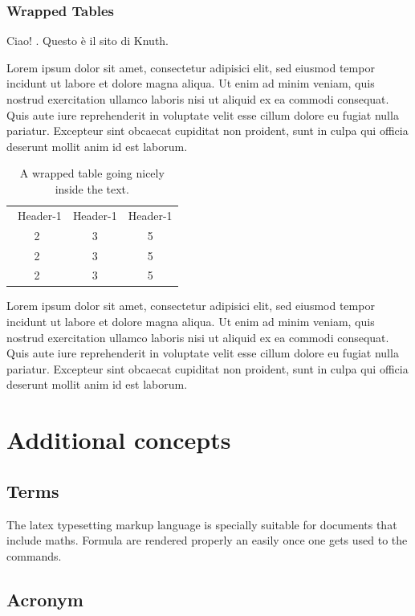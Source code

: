 \subsection{Wrapped Tables}

Ciao! \cite{knuthwebsite}. Questo è il sito di Knuth.

Lorem ipsum dolor sit amet, consectetur adipisici elit, sed eiusmod tempor incidunt ut labore et dolore magna aliqua. Ut enim ad minim veniam, quis nostrud exercitation ullamco laboris nisi ut aliquid ex ea commodi consequat. Quis aute iure reprehenderit in voluptate velit esse cillum dolore eu fugiat nulla pariatur. Excepteur sint obcaecat cupiditat non proident, sunt in culpa qui officia deserunt mollit anim id est laborum.
\begin{table}
\caption{A wrapped table going nicely inside the text.}\label{wrap-tab:1}
\begin{tabular}{ccc}\  
Header-1 & Header-1 & Header-1 \\
2 &3 & 5\\  
2 &3 & 5\\  
2 &3 & 5\\  
\end{tabular}
\end{table}
Lorem ipsum dolor sit amet, consectetur adipisici elit, sed eiusmod tempor incidunt ut labore et dolore magna aliqua. Ut enim ad minim veniam, quis nostrud exercitation ullamco laboris nisi ut aliquid ex ea commodi consequat. Quis aute iure reprehenderit in voluptate velit esse cillum dolore eu fugiat nulla pariatur. Excepteur sint obcaecat cupiditat non proident, sunt in culpa qui officia deserunt mollit anim id est laborum.

\chapter{Additional concepts}

\section{Terms}

The \Gls{latex} typesetting markup language is specially suitable 
for documents that include maths. Formula are rendered 
properly an easily once one gets used to the commands.

\section{Acronym}

